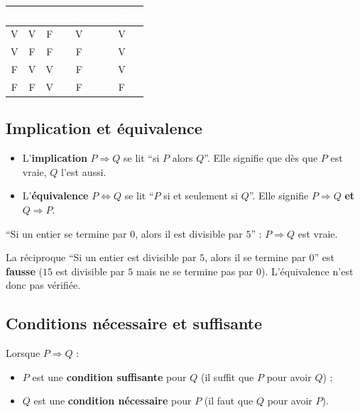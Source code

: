\documentclass[a4paper,11pt]{article}
\begin{document}
\begin{center}
\renewcommand{\arraystretch}{1.4}
\begin{tabular}{|c|c|c|c|c|}
\hline
\rowcolor{uimmblue}
\textcolor{white}{$P$} & \textcolor{white}{$Q$} & \textcolor{white}{$\overline{P}$} & \textcolor{white}{$P$ et $Q$} & \textcolor{white}{$P$ ou $Q$} \\
\hline
V & V & F & V & V \\
\hline
V & F & F & F & V \\
\hline
F & V & V & F & V \\
\hline
F & F & V & F & F \\
\hline
\end{tabular}
\end{center}

\subsection{Implication et équivalence}

\begin{definition}
\begin{itemize}
  \item L'\textbf{implication} $P \Rightarrow Q$ se lit ``si $P$ alors $Q$''. Elle signifie que dès que $P$ est vraie, $Q$ l'est aussi.
  \item L'\textbf{équivalence} $P \Leftrightarrow Q$ se lit ``$P$ si et seulement si $Q$''. Elle signifie $P \Rightarrow Q$ \textbf{et} $Q \Rightarrow P$.
\end{itemize}
\end{definition}

\begin{exemple}[-- Implication]
``Si un entier se termine par $0$, alors il est divisible par $5$'' : $P \Rightarrow Q$ est vraie.

La réciproque ``Si un entier est divisible par $5$, alors il se termine par $0$'' est \textbf{fausse} ($15$ est divisible par $5$ mais ne se termine pas par $0$). L'équivalence n'est donc pas vérifiée.
\end{exemple}

\subsection{Conditions nécessaire et suffisante}

\begin{theoreme}
Lorsque $P \Rightarrow Q$ :
\begin{itemize}
  \item $P$ est une \textbf{condition suffisante} pour $Q$ (il suffit que $P$ pour avoir $Q$) ;
  \item $Q$ est une \textbf{condition nécessaire} pour $P$ (il faut que $Q$ pour avoir $P$).
\end{itemize}
\end{theoreme}
\end{document}

